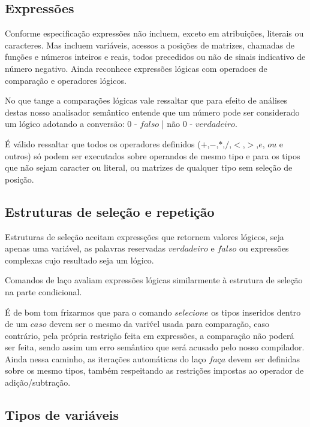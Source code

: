 \documentclass[a4paper,12pt]{report}
\begin{document}
\subsection{Express\~oes}

Conforme especifica\c{c}\~ao express\~oes n\~ao incluem, exceto em atribui\c{c}\~oes, literais 
ou caracteres. Mas incluem vari\'aveis, acessos a posi\c{c}\~oes de matrizes, chamadas de 
fun\c{c}\~oes e n\'umeros inteiros e reais, todos precedidos ou n\~ao de sinais indicativo de 
n\'umero negativo. Ainda reconhece express\~oes l\'ogicas com operadoes de compara\c{c}\~ao e 
operadores l\'ogicos.

No que tange a compara\c{c}\~oes l\'ogicas vale ressaltar que para efeito de an\'alises
destas nosso analisador sem\^antico entende que um n\'umero pode ser considerado um 
l\'ogico adotando a convers\~ao: 0 - $falso$ | n\~ao 0 - $verdadeiro$.

\'E v\'alido ressaltar que todos os operadores definidos ($+$,$-$,$*$,$/$,$<$,$>$,$e$, $ou$ e 
outros) s\'o podem ser executados sobre operandos de mesmo tipo e para os tipos que n\~ao sejam
caracter ou literal, ou matrizes de qualquer tipo sem sele\c{c}\~ao de posi\c{c}\~ao.

\subsection{Estruturas de sele\c{c}\~ao e repeti\c{c}\~ao}

Estruturas de sele\c{c}\~ao aceitam express\c{c}\~oes que retornem valores l\'ogicos, seja 
apenas uma vari\'avel, as palavras reservadas $verdadeiro$ e $falso$ ou express\~oes complexas
cujo resultado seja um l\'ogico.

Comandos de la\c{c}o avaliam express\~oes l\'ogicas similarmente \`a estrutura de sele\c{c}\~ao
na parte condicional.

\'E de bom tom frizarmos que para o comando $selecione$ os tipos inseridos dentro de um $caso$ 
devem ser o mesmo da vari\'vel usada para compara\c{c}\~ao, caso contr\'ario, pela pr\'opria 
restri\c{c}\~ao feita em express\~oes, a compara\c{c}\~ao n\~ao poder\'a ser feita, sendo assim 
um erro sem\^antico que ser\'a acusado pelo nosso compilador. Ainda nessa caminho, as 
itera\c{c}\~oes autom\'aticas do la\c{c}o $fa$\c{c}$a$ devem ser definidas sobre os mesmo
tipos, tamb\'em respeitando as restri\c{c}\~oes impostas ao operador de 
adi\c{c}\~ao/subtra\c{c}\~ao.

\subsection{Tipos de vari\'aveis}
\end{document}
